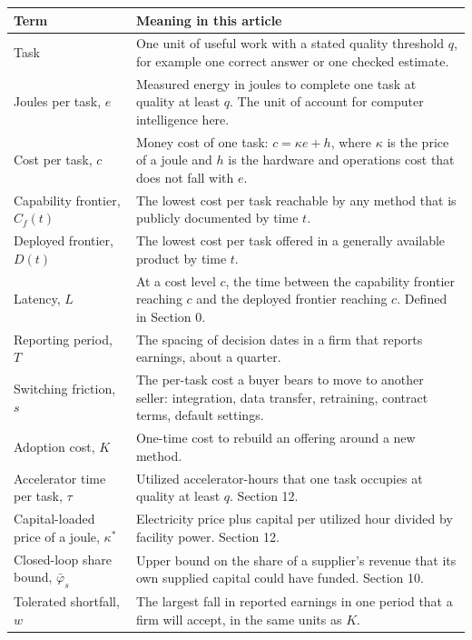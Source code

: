 \documentclass[10pt,letterpaper]{article}
\newcounter{none}
\begin{document}
{\def\LTcaptype{none} %
{\footnotesize\setlength{\tabcolsep}{3.8pt}\renewcommand{\arraystretch}{1.15}
\begin{longtable}[]{@{}
  >{\raggedright\arraybackslash}p{}
  >{\raggedright\arraybackslash}p{}@{}}
\toprule\noalign{}
\begin{minipage}[b]{\linewidth}\raggedright
\textbf{Term}
\end{minipage} & \begin{minipage}[b]{\linewidth}\raggedright
\textbf{Meaning in this article}
\end{minipage} \\
\midrule\noalign{}
\endhead
\bottomrule\noalign{}
\endlastfoot
Task & One unit of useful work with a stated quality threshold \(q\),
for example one correct answer or one checked estimate. \\
Joules per task, \(e\) & Measured energy in joules to complete one task
at quality at least \(q\). The unit of account for computer intelligence
here. \\
Cost per task, \(c\) & Money cost of one task: \(c = \kappa e + h\),
where \(\kappa\) is the price of a joule and \(h\) is the hardware and
operations cost that does not fall with \(e\). \\
Capability frontier, \(C_f(t)\) & The lowest cost per task reachable by
any method that is publicly documented by time \(t\). \\
Deployed frontier, \(D(t)\) & The lowest cost per task offered in a
generally available product by time \(t\). \\
Latency, \(L\) & At a cost level \(c\), the time between the capability
frontier reaching \(c\) and the deployed frontier reaching \(c\).
Defined in Section 0. \\
Reporting period, \(T\) & The spacing of decision dates in a firm that
reports earnings, about a quarter. \\
Switching friction, \(s\) & The per-task cost a buyer bears to move to
another seller: integration, data transfer, retraining, contract terms,
default settings. \\
Adoption cost, \(K\) & One-time cost to rebuild an offering around a new
method. \\
Accelerator time per task, \(\tau\) & Utilized accelerator-hours that
one task occupies at quality at least \(q\). Section 12. \\
Capital-loaded price of a joule, \(\kappa^{*}\) & Electricity price plus
capital per utilized hour divided by facility power. Section 12. \\
Closed-loop share bound, \(\bar\varphi_s\) & Upper bound on the share of
a supplier's revenue that its own supplied capital could have funded.
Section 10. \\
Tolerated shortfall, \(w\) & The largest fall in reported earnings in
one period that a firm will accept, in the same units as \(K\). \\
\end{longtable}
}
}
\end{document}
